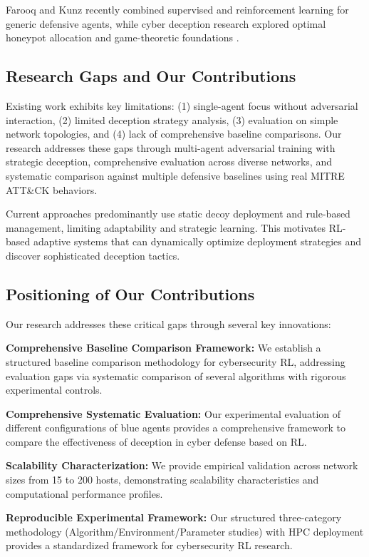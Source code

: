 \documentclass[12pt,oneside]{article}
\begin{document}
Farooq and Kunz \cite{farooq2025combining} recently combined supervised and reinforcement learning for generic defensive agents, while cyber deception research explored optimal honeypot allocation \cite{zhang2022optimal,anwar2022honeypot} and game-theoretic foundations \cite{zhu2021survey}.

\subsection{Research Gaps and Our Contributions}

Existing work exhibits key limitations: (1) single-agent focus without adversarial interaction, (2) limited deception strategy analysis, (3) evaluation on simple network topologies, and (4) lack of comprehensive baseline comparisons. Our research addresses these gaps through multi-agent adversarial training with strategic deception, comprehensive evaluation across diverse networks, and systematic comparison against multiple defensive baselines using real MITRE ATT\&CK behaviors.

Current approaches predominantly use static decoy deployment and rule-based management, limiting adaptability and strategic learning. This motivates RL-based adaptive systems that can dynamically optimize deployment strategies and discover sophisticated deception tactics.

\subsection{Positioning of Our Contributions}

Our research addresses these critical gaps through several key innovations:

\textbf{Comprehensive Baseline Comparison Framework:} We establish a structured baseline comparison methodology for cybersecurity RL, addressing evaluation gaps via systematic comparison of several algorithms with rigorous experimental controls.

\textbf{Comprehensive Systematic Evaluation:} Our experimental evaluation of different configurations of blue agents provides a comprehensive framework to compare the effectiveness of deception in cyber defense based on RL.

\textbf{Scalability Characterization:} We provide empirical validation across network sizes from 15 to 200 hosts, demonstrating scalability characteristics and computational performance profiles.

\textbf{Reproducible Experimental Framework:} Our structured three-category methodology (Algorithm/Environment/Parameter studies) with HPC deployment provides a standardized framework for cybersecurity RL research.
\end{document}
